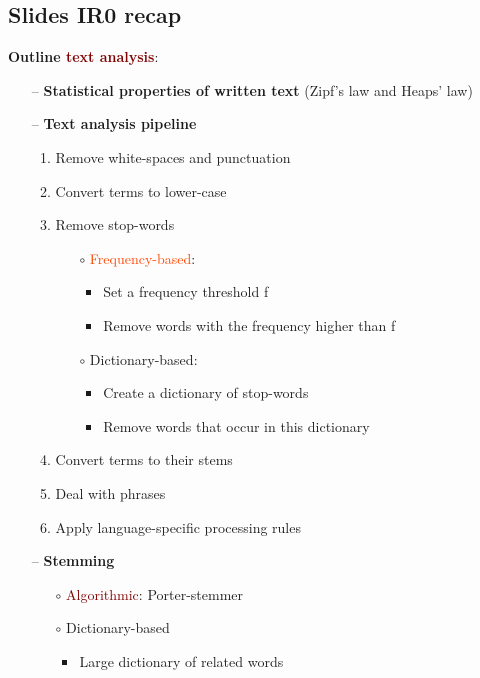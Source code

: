 \newpage
\subsection{Slides IR0 recap}
\textbf{Outline \textcolor{Maroon}{text analysis}}:
\begin{itemize}
    \setlength\itemsep{0em}
    \item[--] \textbf{Statistical properties of written text} (Zipf's law and Heaps' law)
    \item[--] \textbf{Text analysis pipeline}
    \begin{enumerate}
        \item Remove white-spaces and punctuation
        \item Convert terms to lower-case
        \item Remove stop-words
        \begin{itemize}
            \item[$\circ$] \textcolor{OrangeRed}{Frequency-based}: 
            \begin{itemize}
                \item Set a frequency threshold f
                \item Remove words with the frequency higher than f
            \end{itemize}
            \item[$\circ$] \textcolor{JungleGreen}{Dictionary-based}:
            \begin{itemize}
                \item Create a dictionary of stop-words
                \item Remove words that occur in this dictionary
            \end{itemize}
        \end{itemize}
        \item Convert terms to their stems
        \item Deal with phrases
        \item Apply language-specific processing rules
    \end{enumerate}
    \item[--] \textbf{Stemming}
    \begin{itemize}
        \item[$\circ$] \textcolor{Maroon}{Algorithmic}: Porter-stemmer
        \item[$\circ$] \textcolor{JungleGreen}{Dictionary-based}
        \begin{itemize}
            \item Large dictionary of related words

\end{itemize}
\end{itemize}
\end{itemize}
